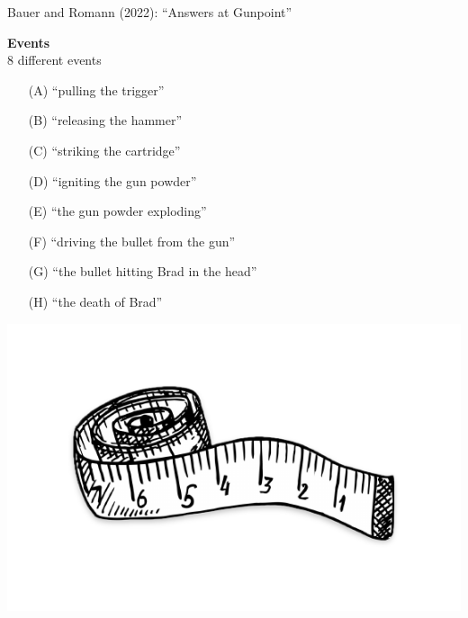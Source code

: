 \documentclass[xcolor=table,9pt,aspectratio=169]{beamer}
\begin{document}
\begin{frame}{\vspace*{10mm}Bauer and Romann (2022): ``Answers at Gunpoint''}
\vspace*{-5mm}
\begin{multicols}{2}
\textbf{Events}\\
8 different events
\begin{itemize}
   \item[(A)] ``pulling the trigger''
   \item[(B)] ``releasing the hammer''
   \item[(C)] ``striking the cartridge''
   \item[(D)] ``igniting the gun powder''
   \item[(E)] ``the gun powder exploding''
   \item[(F)] ``driving the bullet from the gun''
   \item[(G)] ``the bullet hitting Brad in the head''
   \item[(H)] ``the death of Brad''
\end{itemize}
\vfill
\begin{center}
   \includegraphics[width=\linewidth]{figures/tape_measure.pdf}
\end{center}
\end{multicols}
\end{frame}
\end{document}
